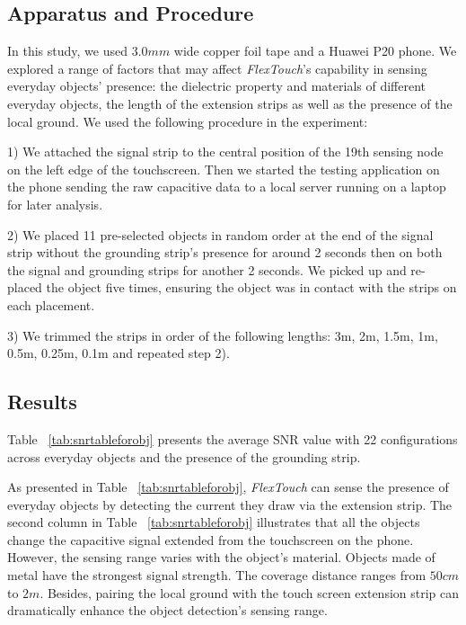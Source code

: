 \subsection{Apparatus and Procedure}
In this study, we used $3.0 mm$ wide copper foil tape and a Huawei P20 phone. We explored a range of factors that may affect \textit{FlexTouch}'s capability in sensing everyday objects' presence: the dielectric property and materials of different everyday objects, the length of the extension strips as well as the presence of the local ground. We used the following procedure in the experiment:

1) We attached the signal strip to the central position of the 19th sensing node on the left edge of the touchscreen. Then we started the testing application on the phone sending the raw capacitive data to a local server running on a laptop for later analysis.

2) We placed 11 pre-selected objects in random order at the end of the signal strip without the grounding strip's presence for around 2 seconds then on both the signal and grounding strips for another 2 seconds. We picked up and re-placed the object five times, ensuring the object was in contact with the strips on each placement.

3) We trimmed the strips in order of the following lengths: 3m, 2m, 1.5m, 1m, 0.5m, 0.25m, 0.1m and repeated step 2).

\subsection{Results}

Table ~\ref{tab:snrtableforobj} presents the average SNR value with 22 configurations across everyday objects and the presence of the grounding strip.

As presented in Table ~\ref{tab:snrtableforobj}, \textit{FlexTouch} can sense the presence of everyday objects by detecting the current they draw via the extension strip. The second column in Table ~\ref{tab:snrtableforobj} illustrates that all the objects change the capacitive signal extended from the touchscreen on the phone. However, the sensing range varies with the object's material. Objects made of metal have the strongest signal strength. The coverage distance ranges from $50 cm$ to $2 m$. Besides, pairing the local ground with the touch screen extension strip can dramatically enhance the object detection's sensing range. 

